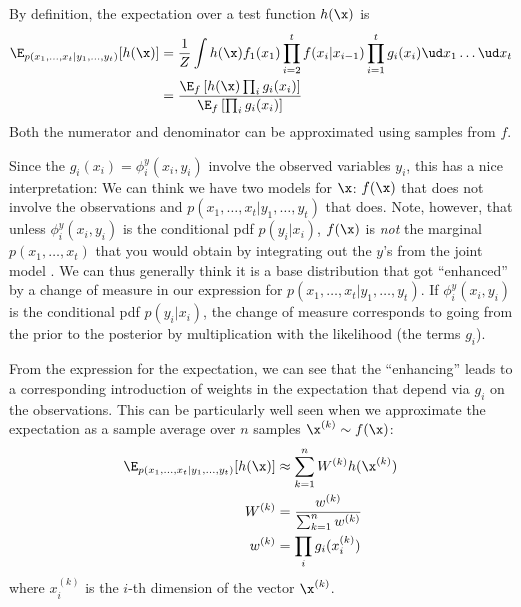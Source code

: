 \begin{exenumerate}
  \begin{solution}

    By definition, the expectation over a test function $h(\x)$ is
    \begin{align}
      \E_{p(x_1, \ldots, x_t | y_1,
        \ldots, y_t)}[ h(\x) ] & = \frac{1}{Z} \int h(\x) f_1(x_1) \prod_{i=2}^t f(x_i|x_{i-1})\prod_{i=1}^t g_i(x_i) \ud x_1 \ldots \ud x_t\\
      & = \frac{\E_f \left[ h(\x) \prod_i g_i(x_i) \right]}{\E_f\left [\prod_i g_i(x_i) \right]}
    \end{align}
    Both the numerator and denominator can be approximated using
    samples from $f$.

    Since the $g_i(x_i) = \phi_i^y(x_i,y_i)$ involve the observed
    variables $y_i$, this has a nice interpretation: We can think we
    have two models for $\x$: $f(\x)$ that does not involve the
    observations and $p(x_1, \ldots, x_t | y_1,\ldots, y_t)$ that
    does. Note, however, that unless $\phi_i^y(x_i, y_i)$ is the
    conditional pdf $p(y_i|x_i)$, $f(\x)$ is \emph{not} the marginal
    $p(x_1, \ldots, x_t)$ that you would obtain by integrating out the
    $y$'s from the joint model . We can thus generally think it is a
    base distribution that got ``enhanced'' by a change of measure in our expression for
    $p(x_1, \ldots, x_t| y_1,\ldots, y_t)$. If $\phi_i^y(x_i, y_i)$ is
    the conditional pdf $p(y_i|x_i)$, the change of measure
    corresponds to going from the prior to the posterior by
    multiplication with the likelihood (the terms $g_i$).

    From the expression for the expectation, we can see that the
    ``enhancing'' leads to a corresponding introduction of weights in
    the expectation that depend via $g_i$ on the observations. This
    can be particularly well seen when we approximate the expectation as
    a sample average over $n$ samples $\x^{(k)} \sim f(\x)$:
    \begin{align}
      \E_{p(x_1, \ldots, x_t | y_1, \ldots, y_t)}[ h(\x) ] & \approx \sum_{k=1}^n W^{(k)} h(\x^{(k)})\\
      W^{(k)} & =  \frac{w^{(k)}}{\sum_{k=1}^n  w^{(k)}}\\
      w^{(k)} & =  \prod_i g_i(x^{(k)}_i)
    \end{align}
    where $x^{(k)}_i$ is the $i$-th dimension of the vector $\x^{(k)}$.
  \end{solution}
  
\end{exenumerate}

